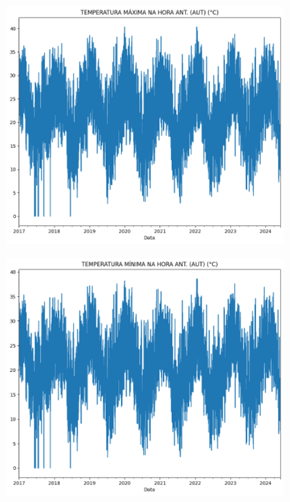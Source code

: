 \begin{itemize}
\begin{figure}[H]
\begin{center}
		\begin{subfigure}{0.35\textwidth}
			\includegraphics[width=\linewidth]{figuras/comparacao_temp_3.png}
		\end{subfigure}
		\begin{subfigure}{0.35\textwidth}
			\includegraphics[width=\linewidth]{figuras/comparacao_temp_4.png}
		\end{subfigure}
		

\end{center}
\end{figure}
\end{itemize}

